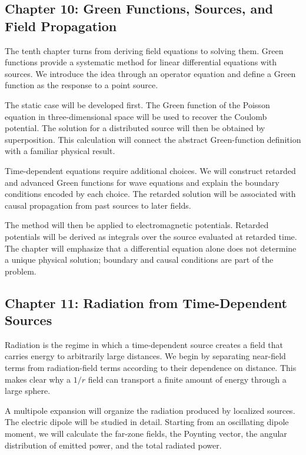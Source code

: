 \subsection*{Chapter 10: Green Functions, Sources, and Field Propagation}

The tenth chapter turns from deriving field equations to solving them. Green functions provide a systematic method for linear differential equations with sources. We introduce the idea through an operator equation and define a Green function as the response to a point source.

The static case will be developed first. The Green function of the Poisson equation in three-dimensional space will be used to recover the Coulomb potential. The solution for a distributed source will then be obtained by superposition. This calculation will connect the abstract Green-function definition with a familiar physical result.

Time-dependent equations require additional choices. We will construct retarded and advanced Green functions for wave equations and explain the boundary conditions encoded by each choice. The retarded solution will be associated with causal propagation from past sources to later fields.

The method will then be applied to electromagnetic potentials. Retarded potentials will be derived as integrals over the source evaluated at retarded time. The chapter will emphasize that a differential equation alone does not determine a unique physical solution; boundary and causal conditions are part of the problem.

\subsection*{Chapter 11: Radiation from Time-Dependent Sources}

Radiation is the regime in which a time-dependent source creates a field that carries energy to arbitrarily large distances. We begin by separating near-field terms from radiation-field terms according to their dependence on distance. This makes clear why a \(1/r\) field can transport a finite amount of energy through a large sphere.

A multipole expansion will organize the radiation produced by localized sources. The electric dipole will be studied in detail. Starting from an oscillating dipole moment, we will calculate the far-zone fields, the Poynting vector, the angular distribution of emitted power, and the total radiated power.

